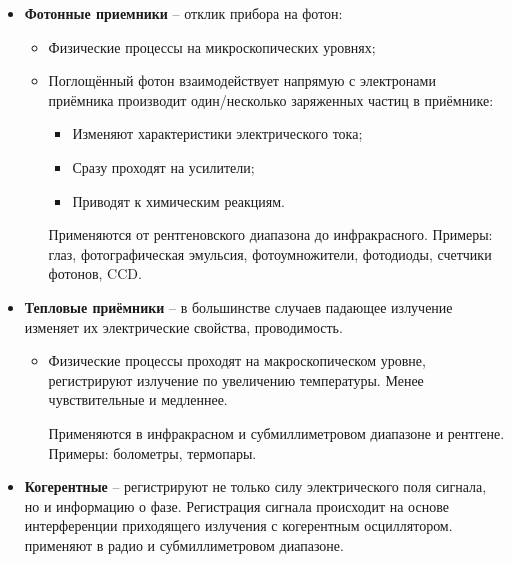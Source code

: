 \documentclass[12pt]{article}
\begin{document}
\begin{itemize}
	\item \textbf{Фотонные приемники} -- отклик прибора на фотон:
		\begin{itemize}
			\item Физические процессы на микроскопических уровнях;
			\item Поглощённый фотон взаимодействует напрямую с электронами приёмника
			производит один/несколько заряженных частиц в приёмнике:
			\begin{itemize}
				\item Изменяют характеристики электрического тока;
				\item Сразу проходят на усилители;
				\item Приводят к химическим реакциям.
			\end{itemize}	
			Применяются от рентгеновского диапазона до инфракрасного. Примеры: глаз, фотографическая эмульсия, фотоумножители, фотодиоды, счетчики фотонов, CCD.
			\end{itemize}	
	\item \textbf{Тепловые приёмники} -- в большинстве случаев
	падающее излучение изменяет их электрические
	свойства, проводимость.
			\begin{itemize}
			\item Физические процессы проходят на макроскопическом уровне,
			регистрируют излучение по увеличению температуры. Менее
			чувствительные и медленнее.	
			
		Применяются в инфракрасном и субмиллиметровом
		диапазоне и рентгене. Примеры: болометры, термопары.
		\end{itemize}	
	\item \textbf{Когерентные} -- регистрируют не только силу электрического поля
	сигнала, но и информацию о фазе. Регистрация сигнала происходит на
	основе интерференции приходящего излучения с когерентным
	осциллятором.
	применяют в радио и субмиллиметровом
	диапазоне.
	

\end{itemize}
\end{document}
